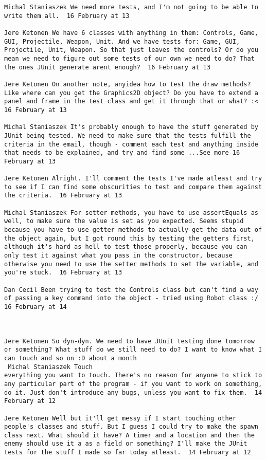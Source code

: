 \begin{verbatim}
Michal Staniaszek We need more tests, and I'm not going to be able to
write them all.  16 February at 13

Jere Ketonen We have 6 classes with anything in them: Controls, Game,
GUI, Projectile, Weapon, Unit. And we have tests for: Game, GUI,
Projectile, Unit, Weapon. So that just leaves the controls? Or do you
mean we need to figure out some tests of our own we need to do? That
the ones JUnit generate arent enough?  16 February at 13

Jere Ketonen On another note, anyidea how to test the draw methods?
Like where can you get the Graphics2D object? Do you have to extend a
panel and frame in the test class and get it through that or what? :<
16 February at 13

Michal Staniaszek It's probably enough to have the stuff generated by
JUnit being tested. We need to make sure that the tests fulfill the
criteria in the email, though - comment each test and anything inside
that needs to be explained, and try and find some ...See more 16
February at 13

Jere Ketonen Alright. I'll comment the tests I've made atleast and try
to see if I can find some obscurities to test and compare them against
the criteria.  16 February at 13

Michal Staniaszek For setter methods, you have to use assertEquals as
well, to make sure the value is set as you expected. Seems stupid
because you have to use getter methods to actually get the data out of
the object again, but I got round this by testing the getters first,
although it's hard as hell to test those properly, because you can
only test it against what you pass in the constructor, because
otherwise you need to use the setter methods to set the variable, and
you're stuck.  16 February at 13

Dan Cecil Been trying to test the Controls class but can't find a way
of passing a key command into the object - tried using Robot class :/
16 February at 14



Jere Ketonen So dyn-dyn. We need to have JUnit testing done tomorrow
or something? What stuff do we still need to do? I want to know what I
can touch and so on :D about a month 
 Michal Staniaszek Touch
everything you want to touch. There's no reason for anyone to stick to
any particular part of the program - if you want to work on something,
do it. Just don't introduce any bugs, unless you want to fix them.  14
February at 12

Jere Ketonen Well but it'll get messy if I start touching other
people's classes and stuff. But I guess I could try to make the spawn
class next. What should it have? A timer and a location and then the
enemy should use it a as a field or something? I'll make the JUnit
tests for the stuff I made so far today atleast.  14 February at 12


\end{verbatim}
